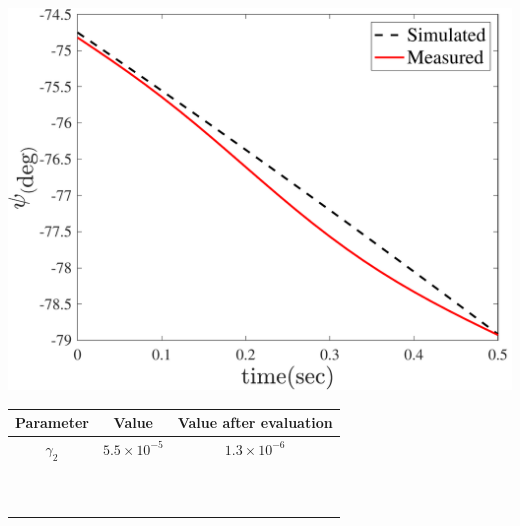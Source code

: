 \documentclass[3p,times]{elsarticle}
\newcommand\Tstrut{\rule{0pt}{2.6ex}}         %
\begin{document}
\begin{minipage}[t]{0.95\linewidth}
	\hfill
    \begin{minipage}[b]{0.48\linewidth}
		\centering
		\includegraphics[width=1\linewidth]{../Figure/parameter_estimation/yaw/yaw}
		\captionsetup{justification=centering}
	\end{minipage}
	\begin{minipage}[b]{0.49\linewidth}
		\centering
		\begin{tabular}{ccc}\hline
			Parameter & Value & Value after evaluation
            \Tstrut\\ \hline
			$\gamma_2$  & $5.5\times10^{-5}$ & $1.3\times10^{-6}$  \Tstrut\\ \hline
			\\
			\\\\\\\\\\\\\\\\\\
		\end{tabular}
	\captionsetup{justification=centering}
	\end{minipage}
\end{minipage}
\end{document}

